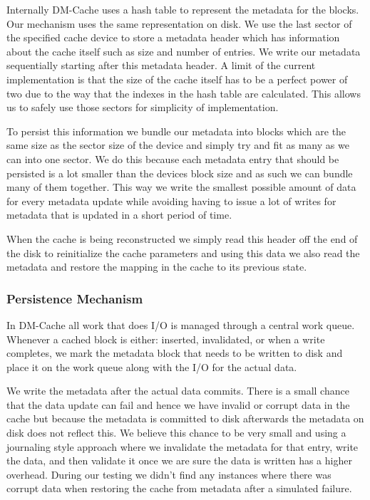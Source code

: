 Internally DM-Cache uses a hash table to represent the metadata for
the blocks. Our mechanism uses the same representation on disk. We use
the last sector of the specified cache device to store a metadata
header which has information about the cache itself such as size and
number of entries. We write our metadata sequentially starting after
this metadata header. A limit of the current implementation is that
the size of the cache itself has to be a perfect power of two due to
the way that the indexes in the hash table are calculated. This allows
us to safely use those sectors for simplicity of implementation.

To persist this information we bundle our metadata into blocks which
are the same size as the sector size of the device and simply try and
fit as many as we can into one sector. We do this because each
metadata entry that should be persisted is a lot smaller than the
devices block size and as such we can bundle many of them
together. This way we write the smallest possible amount of data for
every metadata update while avoiding having to issue a lot of writes
for metadata that is updated in a short period of time.

When the cache is being reconstructed we simply read this header off
the end of the disk to reinitialize the cache parameters and using
this data we also read the metadata and restore the mapping in the
cache to its previous state.

\subsubsection{Persistence Mechanism}

In DM-Cache all work that does I/O is managed through a central work
queue. Whenever a cached block is either: inserted, invalidated, or
when a write completes, we mark the metadata block that needs to be
written to disk and place it on the work queue along with the I/O for
the actual data.

We write the metadata after the actual data commits. There is a small
chance that the data update can fail and hence we have invalid or
corrupt data in the cache but because the metadata is committed to
disk afterwards the metadata on disk does not reflect this. We believe
this chance to be very small and using a journaling style approach
where we invalidate the metadata for that entry, write the data, and
then validate it once we are sure the data is written has a higher
overhead. During our testing we didn't find any instances where there
was corrupt data when restoring the cache from metadata after a
simulated failure.

